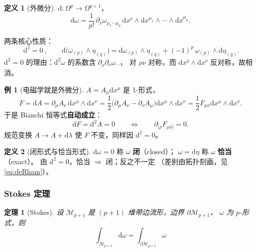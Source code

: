 \documentclass[UTF8,a4paper,11pt]{ctexart}
\theoremstyle{plain}
\newtheorem{theorem}{定理}[section]
\theoremstyle{definition}
\newtheorem{definition}{定义}[section]
\newtheorem{example}{例}[section]
\theoremstyle{remark}
\newcommand{\ext}{\mathrm{d}}          %
\newcommand{\Mfd}{\mathcal{M}}
\newcommand{\en}[1]{\textsf{#1}}       %
\begin{document}
\begin{definition}[外微分]
$\ext:\Omega^p\to\Omega^{p+1}$，
\begin{equation}
  \ext\omega=\frac{1}{p!}\,\partial_\nu\omega_{\mu_1\cdots\mu_p}\,
  \ext x^\nu\wedge \ext x^{\mu_1}\wedge\cdots\wedge \ext x^{\mu_p} .
\end{equation}
\end{definition}

两条核心性质：
\begin{equation}
  \boxed{\ \ext^2=0\ },
  \qquad
  \ext\big(\omega_{(p)}\wedge\eta_{(q)}\big)
  =\ext\omega_{(p)}\wedge\eta_{(q)}
  +(-1)^p\,\omega_{(p)}\wedge \ext\eta_{(q)} .
  \label{eq:dsquared}
\end{equation}
$\ext^2=0$ 的理由：$\ext^2\omega$ 的系数含
$\partial_\rho\partial_\nu\omega_{\cdots}$，
对 $\rho\nu$ 对称，而 $\ext x^\rho\wedge \ext x^\nu$ 反对称，故相消。

\begin{example}[电磁学就是外微分]
$A=A_\mu \ext x^\mu$ 是 1-形式，
\begin{equation}
  F=\ext A=\partial_\mu A_\nu\,\ext x^\mu\wedge \ext x^\nu
  =\frac12\big(\partial_\mu A_\nu-\partial_\nu A_\mu\big)
  \ext x^\mu\wedge \ext x^\nu
  =\frac12 F_{\mu\nu}\ext x^\mu\wedge \ext x^\nu .
\end{equation}
于是 Bianchi 恒等式\textbf{自动成立}：
\begin{equation}
  \ext F=\ext^2A=0
  \qquad\Longleftrightarrow\qquad
  \partial_{[\rho}F_{\mu\nu]}=0 .
  \label{eq:bianchi}
\end{equation}
规范变换 $A\to A+\ext\lambda$ 使 $F$ 不变，同样因 $\ext^2=0$。
\end{example}

\begin{definition}[闭形式与恰当形式]
$\ext\omega=0$ 称 $\omega$ \textbf{闭}（\en{closed}）；
$\omega=\ext\eta$ 称 $\omega$ \textbf{恰当}（\en{exact}）。
由 $\ext^2=0$，恰当 $\Rightarrow$ 闭；反之不一定
（差别由拓扑刻画，见 \eqref{eq:deRham}）。
\end{definition}

\subsubsection{Stokes 定理}

\begin{theorem}[Stokes]
设 $\Mfd_{p+1}$ 是 $(p+1)$ 维带边流形，边界 $\partial\Mfd_{p+1}$，
$\omega$ 为 $p$-形式，则
\begin{equation}
  \boxed{\ \int_{\Mfd_{p+1}}\ext\omega
  =\int_{\partial\Mfd_{p+1}}\omega\ }
  \label{eq:stokes}
\end{equation}
\end{theorem}
\end{document}
